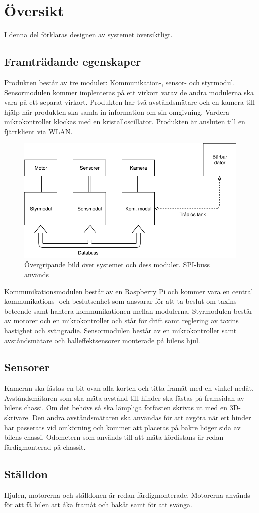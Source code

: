 \documentclass[designspec/spec.tex]{subfiles}
\begin{document}
\section{Översikt}
I denna del förklaras designen av systemet översiktligt.

\subsection{Framträdande egenskaper}
Produkten består av tre moduler: Kommunikation-, sensor- och styrmodul.
Sensormodulen kommer implenteras på ett virkort varav de andra modulerna ska
vara på ett separat virkort. Produkten har två avståndsmätare och en kamera
till hjälp när produkten ska samla in information om sin omgivning. Vardera
mikrokontroller klockas med en kristalloscillator. Produkten är ansluten till en
fjärrklient via WLAN.

\begin{figure}[h]
    \centering
    \includegraphics[width=0.6\linewidth]{designspec/fig/blockskiss.pdf}
    \caption{Övergripande bild över systemet och dess moduler. SPI-buss används}
    \label{fig:overview}
\end{figure}

\noindent
Kommunikationsmodulen består av en Raspberry Pi och kommer vara en central
kommun\-ikations- och beslutsenhet som ansvarar för att ta beslut om taxins
beteende samt hantera kommunikationen mellan modulerna. Styrmodulen består av
motorer och en mikrokontroller och står för drift samt reglering av taxins
hastighet och svängradie. Sensormodulen består av en mikrokontroller samt
avståndsmätare och halleffektsensorer monterade på bilens hjul.

\subsection{Sensorer}
Kameran ska fästas en bit ovan alla korten och titta framåt med en vinkel
nedåt. Avståndsmätaren som ska mäta avstånd till hinder ska fästas på framsidan
av bilens chassi. Om det behövs så ska lämpliga fotfästen skrivas ut med en
3D-skrivare. Den andra avståndsmätaren ska användas för att avgöra när ett
hinder har passerats vid omkörning och kommer att placeras på bakre höger sida
av bilens chassi. Odometern som används till att mäta kördistans är redan
färdigmonterad på chassit.

\subsection{Ställdon}
Hjulen, motorerna och ställdonen är redan färdigmonterade. Motorerna används
för att få bilen att åka framåt och bakåt samt för att svänga.
\end{document}
